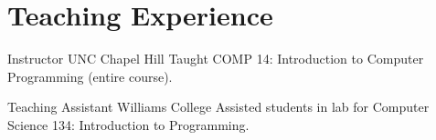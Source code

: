 \section{Teaching Experience}
		{Instructor}
		{UNC Chapel Hill}{}{}
		{Taught COMP 14: Introduction to Computer Programming (entire course).}
	
		{Teaching Assistant}
		{Williams College}{}{}
		{Assisted students in lab for Computer Science 134: Introduction to Programming.}

